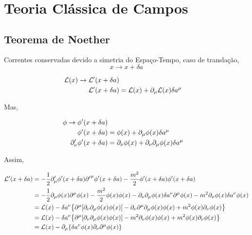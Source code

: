 \documentclass[twoside]{amsart}
\numberwithin{equation}{section}
\begin{document}


\section{Teoria Clássica de Campos}

\subsection{Teorema de Noether}

Correntes conservadas devido a simetria do Espaço-Tempo, caso de 
translação, $$x\rightarrow x+\delta a$$

\begin{align}
    \mathcal L\qty(x)\rightarrow \mathcal L'\qty(x+\delta a)\\
    \mathcal L'\qty(x+\delta a)&=\mathcal L\qty(x)+\partial_\mu \mathcal L\qty(x)\delta a^\mu
\end{align}

Mas, 

\begin{align}
    \phi\rightarrow \phi'\qty(x+\delta a)\\
    \phi'\qty(x+\delta a)&=\phi(x)+\partial_\mu\phi\qty(x)\delta a^\mu\\
    \partial_\nu'\phi'\qty(x+\delta a)&=\partial_\nu\phi\qty(x)+\partial_\nu\partial_\mu\phi\qty(x)\delta a^\mu
\end{align}

Assim,

\begin{align}
    \mathcal L'\qty(x+\delta a)&=-\frac12\partial_\mu'\phi'\qty(x+\delta a){\partial'}^\mu \phi'\qty(x+\delta a) -
    \frac{m^2}{2}\phi'\qty(x+\delta a)\phi'\qty(x+\delta a)\\
    &=-\frac12\partial_\mu\phi\qty(x)\partial^\mu\phi\qty(x)-\frac{m^2}{2}\phi\qty(x)\phi\qty(x)-
    \partial_\nu\partial_\mu\phi\qty(x)\delta a^\nu\partial^\mu\phi\qty(x)-m^2\partial_\nu\phi\qty(x)\delta a^\nu\phi\qty(x)\\
    &=\mathcal L\qty(x)-\delta a^\nu\qty{\partial^\mu\qty[\partial_\nu\partial_\mu\phi\qty(x)\phi\qty(x)]-\partial_\nu\partial^\mu\partial_\mu\phi\qty(x)\phi\qty(x)+m^2\phi\qty(x)\partial_\nu\phi\qty(x)}\\
    &=\mathcal L\qty(x)-\delta a^\nu\qty{\partial^\mu\qty[\partial_\nu\partial_\mu\phi\qty(x)\phi\qty(x)]-m^2\partial_\nu\phi\qty(x)\phi\qty(x)+m^2\phi\qty(x)\partial_\nu\phi\qty(x)}\\
    &=\mathcal L\qty(x)-\partial_\mu\qty{\delta a^\nu\phi\qty(x)\partial_\nu\partial^\mu\phi\qty(x)}
\end{align}
\end{document}
